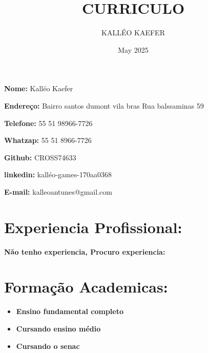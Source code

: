 \documentclass[a4paper, 12pt]{article}
\title{CURRICULO}
\author{KALLÉO KAEFER}
\date{May 2025}
\begin{document}
\noident \textbf{Nome: } Kalléo Kaefer



\textbf{Endereço: } Bairro santos dumont vila bras Rua balssaminas 59



\textbf{Telefone: } 55 51 98966-7726



\textbf{Whatzap: } 55 51 8966-7726



\textbf{Github: } CROSS74633



\textbf{linkedin: } kalléo-games-170aa0368



\textbf{E-mail: } kalleoantunes@gmail.com

\vspace{1cm}

\section{Experiencia Profissional: } 
\textbf{Não tenho experiencia, Procuro experiencia:}


\section{Formação Academicas: }
\begin{itemize}
    \item \textbf{Ensino fundamental completo }
    \end{itemize}
    \begin{itemize}
        \item \textbf{Cursando ensino médio }
    \end{itemize}
    \begin{itemize}
        \item \textbf{Cursando o senac }
    \end{itemize}
    
\end{document}
